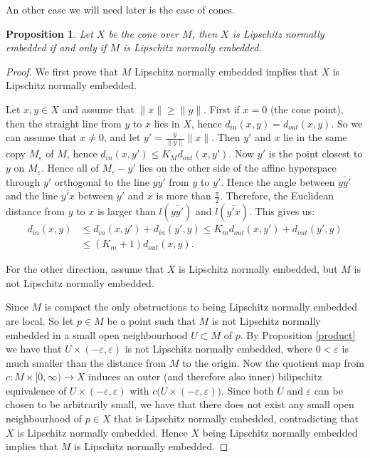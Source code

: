 \documentclass[a4paper,oneside]{amsart}
\newtheorem{prop}[thm]{Proposition}
\theoremstyle{definition}
\begin{document}
An other case we will need later is the case of cones.

\begin{prop}\label{cone}
Let $X$ be the cone over $M$, then
$X$ is Lipschitz normally embedded if and only if $M$ is Lipschitz
normally embedded. 
\end{prop}
\begin{proof}
We first prove that $M$ Lipschitz normally embedded implies that $X$
is Lipschitz normally embedded.

Let $x,y\in X$ and assume that ${\lVert {x} \rVert}\geq{\lVert {y} \rVert}$. First if $x=0$
(the cone point), then the straight line from $y$ to $x$ lies in $X$,
hence $d_{in}(x,y)=d_{out}(x,y)$. So we can assume that $x\neq 0$, and
let $y'=\tfrac{y}{{\lVert {y} \rVert}}{\lVert {x} \rVert}$. Then $y'$ and $x$ lie in the
same copy $M_{\varepsilon}$
of $M$, hence $d_{in}(x,y')\leq K_M d_{out}(x,y')$. Now $y'$ is the point
closest to $y$ on $M_{\varepsilon}$. Hence all of $M_{\varepsilon}-y'$ lies on
the other side of the affine hyperspace through $y'$ orthogonal to the
line $\overline{yy'}$ from $y$ to $y'$. Hence the angle between
$\overline{yy'}$ and the line $\overline{y'x}$ between $y'$ and $x$ is
more than $\tfrac{\pi}{2}$. Therefore, the Euclidean distance from $y$ to
$x$ is larger than $l(\overline{yy'})$ and $l(\overline{y'x})$. This gives
us:
\begin{align*}
d_{in}(x,y) &\leq d_{in}(x,y')+ d_{in}(y',y) \leq
K_md_{out}(x,y')+d_{out}(y',y)\\ &\leq (K_m+1)d_{out}(x,y).
\end{align*}

For the other direction, assume that $X$ is Lipschitz normally
embedded, but $M$ is not Lipschitz normally embedded. 

Since $M$ is compact the only obstructions to being Lipschitz normally
embedded are local. So let $p\in M$ be a point such that $M$ is not
Lipschitz normally embedded in a small open neighbourhood $U\subset M$ of $p$. By
Proposition \ref{product} we have that $U\times (-{\varepsilon},{\varepsilon})$ is not
Lipschitz normally embedded, where $0<{\varepsilon}$ is much smaller than
the distance from $M$ to the origin. Now the quotient map from
${ {c} \colon {M\times [0,\infty)} \to {X}}$ induces an outer (and therefore also
inner) bilipschitz equivalence of $U\times (-{\varepsilon},{\varepsilon})$ with
$c\big(U\times (-{\varepsilon},{\varepsilon})\big)$. Since both $U$ and
${\varepsilon}$ can be chosen to be arbitrarily small, we have that there
does not exist any small open neighbourhood of $p\in X$ that is
Lipschitz normally embedded, contradicting that $X$ is Lipschitz
normally embedded. Hence $X$ being Lipschitz normally embedded implies
that $M$ is Lipschitz normally embedded.  

\end{proof}
\end{document}
